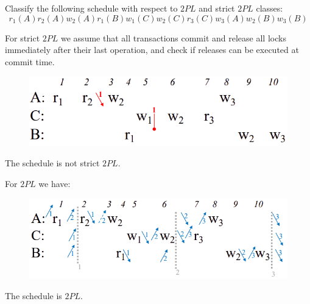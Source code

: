 \documentclass[12pt, a4paper]{report}
\newtheorem[style=M,bodystyle=\normalfont]{theorem}{Theorem}
\newtheorem[style=M,bodystyle=\normalfont]{corollary}{Corollary}
\newtheorem[style=M,bodystyle=\normalfont]{lemma}{Lemma}
\newtheorem[style=M,bodystyle=\normalfont]{definition}{Definition}
\begin{document}
    \newpage

    \begin{Exercise}[label=9]
        Classify the following schedule with respect to $2PL$ and strict $2PL$ classes: 
        \[r_1(A) r_2(A) w_2(A) r_1(B) w_1(C) w_2(C) r_3(C) w_3(A) w_2(B) w_3(B)\]
    \end{Exercise}
    \begin{Answer}[ref=9]
        For strict $2PL$ we assume that all transactions commit and release all locks immediately after their last operation, and check if releases can be executed at commit time.
        \begin{figure}[H]
            \centering
            \includegraphics[width=1\linewidth]{images/2PL5.png}
        \end{figure}
        The schedule is not strict $2PL$.

        For $2PL$ we have: 
        \begin{figure}[H]
            \centering
            \includegraphics[width=1\linewidth]{images/2PL6.png}
        \end{figure}
        The schedule is $2PL$. 
    \end{Answer}

    \newpage
\end{document}
